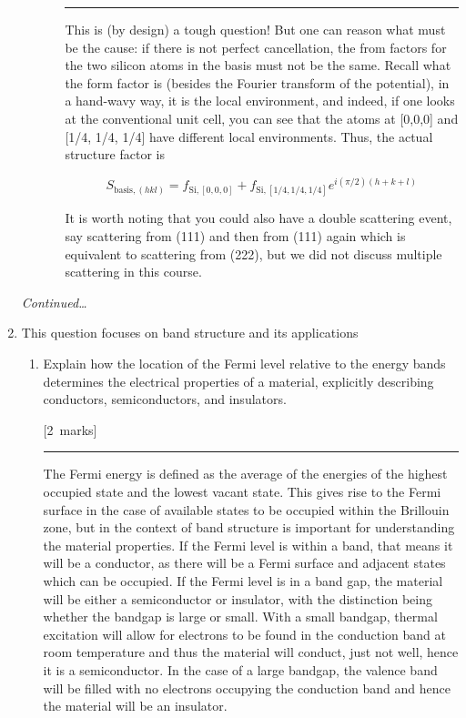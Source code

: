\documentclass[12pt,a4paper]{article}
\newcommand{\sepline}[0]{\par \hfil\rule{10cm}{0.4pt} \vspace*{\parskip}\hfil}
\begin{document}
\begin{enumerate}
\begin{enumerate}
\begin{enumerate}
\begin{answer}
							\sepline

							This is (by design) a tough question! But one can reason what must be the cause: if there is not perfect cancellation, the from factors for the two silicon atoms in the basis must not be the same. Recall what the form factor is (besides the Fourier transform of the potential), in a hand-wavy way, it is the local environment, and indeed, if one looks at the conventional unit cell, you can see that the atoms at [0,0,0] and [1/4, 1/4, 1/4] have different local environments. Thus, the actual structure factor is

							$$
							S_{\mathrm{basis}, (hkl)} = f_{\textrm{Si}, [0,0,0]} + f_{\textrm{Si}, [1/4,1/4,1/4]} e^{i(\pi/2)(h+k+l)}
							$$

							It is worth noting that you could also have a double scattering event, say scattering from (111) and then from (111) again which is equivalent to scattering from (222), but we did not discuss multiple scattering in this course.
						\end{answer}

					\end{enumerate}
				\end{enumerate}

			\vfill \textit{Continued\ldots} \newpage


			\item This question focuses on band structure and its applications
				\begin{enumerate}

					\item Explain how the location of the Fermi level relative to the energy bands determines the electrical properties of a material, explicitly describing conductors, semiconductors, and insulators.

					\hfill{[2~marks]}

					\begin{answer}

						\sepline

						The Fermi energy is defined as the average of the energies of the highest occupied state and the lowest vacant state. This gives rise to the Fermi surface in the case of available states to be occupied within the Brillouin zone, but in the context of band structure is important for understanding the material properties. If the Fermi level is within a band, that means it will be a conductor, as there will be a Fermi surface and adjacent states which can be occupied. If the Fermi level is in a band gap, the material will be either a semiconductor or insulator, with the distinction being whether the bandgap is large or small. With a small bandgap, thermal excitation will allow for electrons to be found in the conduction band at room temperature and thus the material will conduct, just not well, hence it is a semiconductor. In the case of a large bandgap, the valence band will be filled with no electrons occupying the conduction band and hence the material will be an insulator.


\end{answer}
\end{enumerate}
\end{enumerate}
\end{document}
